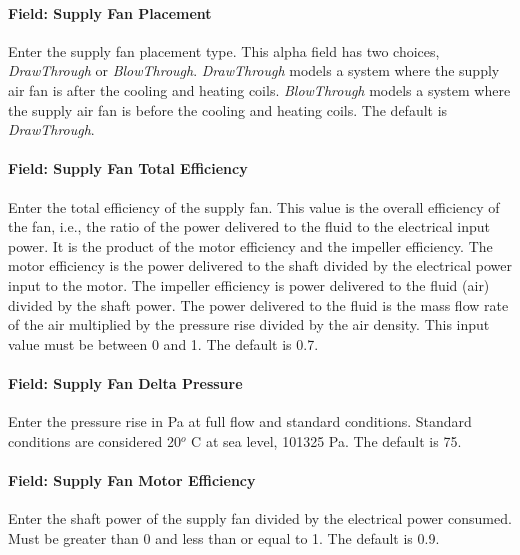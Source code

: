 \paragraph{Field: Supply Fan Placement}\label{field-supply-fan-placement}

Enter the supply fan placement type. This alpha field has two choices, \emph{DrawThrough} or \emph{BlowThrough}. \emph{DrawThrough} models a system where the supply air fan is after the cooling and heating coils. \emph{BlowThrough} models a system where the supply air fan is before the cooling and heating coils. The default is \emph{DrawThrough}.

\paragraph{Field: Supply Fan Total Efficiency}\label{field-supply-fan-total-efficiency-1}

Enter the total efficiency of the supply fan. This value is the overall efficiency of the fan, i.e., the ratio of the power delivered to the fluid to the electrical input power. It is the product of the motor efficiency and the impeller efficiency. The motor efficiency is the power delivered to the shaft divided by the electrical power input to the motor. The impeller efficiency is power delivered to the fluid (air) divided by the shaft power. The power delivered to the fluid is the mass flow rate of the air multiplied by the pressure rise divided by the air density. This input value must be between 0 and 1. The default is 0.7.

\paragraph{Field: Supply Fan Delta Pressure}\label{field-supply-fan-delta-pressure}

Enter the pressure rise in Pa at full flow and standard conditions. Standard conditions are considered 20\(^{o}\) C at sea level, 101325 Pa. The default is 75.

\paragraph{Field: Supply Fan Motor Efficiency}\label{field-supply-fan-motor-efficiency-1}

Enter the shaft power of the supply fan divided by the electrical power consumed. Must be greater than 0 and less than or equal to 1. The default is 0.9.

